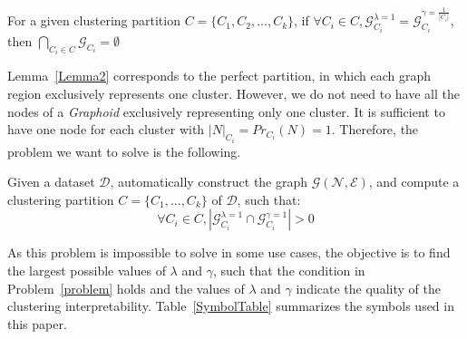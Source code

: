 \begin{lemma}
    For a given clustering partition $C = \{C_1,C_2,...,C_k\}$, if $\forall C_i \in C, \mathcal{G}^{\lambda=1}_{C_i} = \mathcal{G}^{\gamma=\frac{1}{|C_i|}}_{C_i}$, then $\bigcap_{C_i \in C} \mathcal{G}_{C_i} = \emptyset$
    \label{Lemma2} 
\end{lemma} 

Lemma~\ref{Lemma2} corresponds to the perfect partition, in which each graph region exclusively represents one cluster. 
However, we do not need to have all the nodes of a {\it Graphoid} exclusively representing only one cluster. 
It is sufficient to have one node for each cluster with $|N|_{C_i} = Pr_{C_i}(N) = 1$.  
Therefore, the problem we want to solve is the following.

\begin{problem}
	Given a dataset $\mathcal{D}$, automatically construct the graph $\mathcal{G}(\mathcal{N},\mathcal{E})$, and compute a clustering partition $C = \{C_1,...,C_k\}$ of $\mathcal{D}$, such that:  
{\small
 \[
 \forall C_i \in C, |\mathcal{G}^{\lambda=1}_{C_i}  \cap \mathcal{G}^{\gamma=1}_{C_i} |> 0
 \]
 }
 \label{problem}
\end{problem}

As this problem is impossible to solve in some use cases, the objective is to find the largest possible values of $\lambda$ and $\gamma$, such that the condition in Problem~\ref{problem} holds and the values of $\lambda$ and $\gamma$ indicate the quality of the clustering interpretability. Table~\ref{SymbolTable} summarizes the symbols used in this paper.

